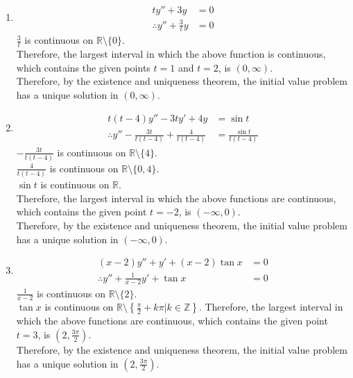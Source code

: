 \documentclass[fleqn, a4paper, 11pt, oneside]{amsart}
\theoremstyle{definition}
\theoremstyle{theorem}
\begin{document}
\begin{solution}
	\begin{enumerate}[leftmargin = *]
		\item
			\begin{align*}
				t y'' + 3 y                    & = 0 \\
				\therefore y'' + \frac{3}{t} y & = 0
			\end{align*}
			$\frac{3}{t}$ is continuous on $\mathbb{R} \setminus \{0\}$.\\
			Therefore, the largest interval in which the above function is continuous, which contains the given points $t = 1$ and $t = 2$, is $(0,\infty)$.\\
			Therefore, by the existence and uniqueness theorem, the initial value problem has a unique solution in $(0,\infty)$.
		\item
			\begin{align*}
				t (t - 4) y'' - 3 t y' + 4 y                                 & = \sin t \\
				\therefore y'' - \frac{3 t}{t (t - 4)} + \frac{4}{t (t - 4)} & = \frac{\sin t}{t (t - 4)}
			\end{align*}
			$-\frac{3 t}{t (t - 4)}$ is continuous on $\mathbb{R} \setminus \{4\}$.\\
			$\frac{4}{t (t - 4)}$ is continuous on $\mathbb{R} \setminus \{0,4\}$.\\
			$\sin t$ is continuous on $\mathbb{R}$.\\
			Therefore, the largest interval in which the above functions are continuous, which contains the given point $t = -2$, is $(-\infty,0)$.\\
			Therefore, by the existence and uniqueness theorem, the initial value problem has a unique solution in $(-\infty,0)$.
		\item
			\begin{align*}
				(x - 2) y'' + y' + (x - 2) \tan x            & = 0 \\
				\therefore y'' + \frac{1}{x - 2} y' + \tan x & = 0
			\end{align*}
			$\frac{1}{x - 2}$ is continuous on $\mathbb{R} \setminus \{2\}$.\\
			$\tan x$ is continuous on $\mathbb{R} \setminus \left\{ \frac{\pi}{2} + k \pi | k \in \mathbb{Z} \right\}$.
			Therefore, the largest interval in which the above functions are continuous, which contains the given point $t = 3$, is $\left( 2 , \frac{3 \pi}{2} \right)$.\\
			Therefore, by the existence and uniqueness theorem, the initial value problem has a unique solution in $\left( 2 , \frac{3 \pi}{2} \right)$.
	\end{enumerate}
\end{solution}
\end{document}
